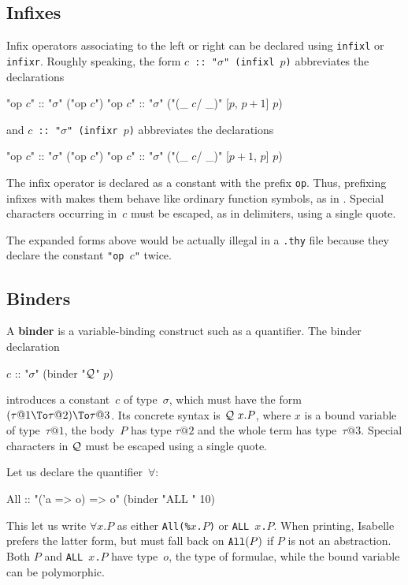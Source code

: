 \subsection{Infixes}
Infix operators associating to the left or right can be declared
using {\tt infixl} or {\tt infixr}.
Roughly speaking, the form {\tt $c$ ::\ "$\sigma$" (infixl $p$)}
abbreviates the declarations
\begin{ttbox}
"op \(c\)" :: "\(\sigma\)"   ("op \(c\)")
"op \(c\)" :: "\(\sigma\)"   ("(_ \(c\)/ _)" [\(p\), \(p+1\)] \(p\))
\end{ttbox}
and {\tt $c$ ::\ "$\sigma$" (infixr $p$)} abbreviates the declarations
\begin{ttbox}
"op \(c\)" :: "\(\sigma\)"   ("op \(c\)")
"op \(c\)" :: "\(\sigma\)"   ("(_ \(c\)/ _)" [\(p+1\), \(p\)] \(p\))
\end{ttbox}
The infix operator is declared as a constant with the prefix {\tt op}.
Thus, prefixing infixes with  makes them behave like ordinary
function symbols, as in \ML.  Special characters occurring in~$c$ must be
escaped, as in delimiters, using a single quote.

The expanded forms above would be actually illegal in a {\tt .thy} file
because they declare the constant \hbox{\tt"op \(c\)"} twice.


\subsection{Binders}
\begingroup
\def\Q{{\cal Q}}
A {\bf binder} is a variable-binding construct such as a quantifier.  The
binder declaration 
\begin{ttbox}
\(c\) :: "\(\sigma\)"   (binder "\(\Q\)" \(p\))
\end{ttbox}
introduces a constant~$c$ of type~$\sigma$, which must have the form
$(\tau@1 \To \tau@2) \To \tau@3$.  Its concrete syntax is $\Q~x.P$, where
$x$ is a bound variable of type~$\tau@1$, the body~$P$ has type $\tau@2$
and the whole term has type~$\tau@3$.  Special characters in $\Q$ must be
escaped using a single quote.

Let us declare the quantifier~$\forall$:
\begin{ttbox}
All :: "('a => o) => o"   (binder "ALL " 10)
\end{ttbox}
This let us write $\forall x.P$ as either {\tt All(\%$x$.$P$)} or {\tt ALL
  $x$.$P$}.  When printing, Isabelle prefers the latter form, but must fall
back on $\mbox{\tt All}(P)$ if $P$ is not an abstraction.  Both $P$ and {\tt ALL
  $x$.$P$} have type~$o$, the type of formulae, while the bound variable
can be polymorphic.

